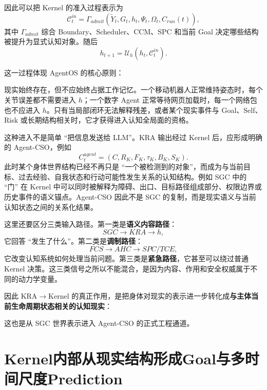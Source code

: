 因此可以把 Kernel 的准入过程表示为
\[
\mathcal C_t^{in}
=
\Gamma_{admit}
\left(
\tilde Y_t,
G_t,
h_t,
\Psi_t,
\Omega_t,
C_{run}(t)
\right),
\]
其中 $\Gamma_{admit}$ 综合 Boundary、Scheduler、CCM、SPC 和当前 Goal 决定哪些结构被提升为显式认知对象。随后
\[
h_{t+1}
=
\mathcal U_h
\left(
h_t,
\mathcal C_t^{in}
\right).
\]

这一过程体现 AgentOS 的核心原则：
\begin{statementbox}
\centering
{}
\end{statementbox}
现实始终存在，但不应始终占据工作记忆。一个移动机器人正常维持姿态时，每个关节误差都不需要进入 $h$；一个数字 Agent 正常等待网页加载时，每一个网络包也不应进入 $h$。只有当局部闭环无法解释残差，或者某个现实事件与 Goal、Self、Risk 或长期结构相关时，它才获得进入认知全局面的资格。

这种进入不是简单 ``把信息发送给 LLM''。KRA 输出经过 Kernel 后，应形成明确的 Agent-CSO，例如
\[
C_t^{agent}
=
\left(
C,
R_K,
F_K,
\tau_K,
B_K,
S_K
\right).
\]
此时某个身体世界结构已经不再只是 ``一个被检测到的对象''，而成为与当前目标、过去经验、自我状态和行动可能性发生关系的认知结构。例如 SGC 中的 ``门'' 在 Kernel 中可以同时被解释为障碍、出口、目标路径组成部分、权限边界或历史事件的语义锚点。Agent-CSO 因此不是 SGC 的复制，而是现实语义与当前认知状态之间的关系化结果。

这里还要区分三类输入路径。第一类是\textbf{语义内容路径}：
\[
SGC
\rightarrow
KRA
\rightarrow
h ,
\]
它回答 ``发生了什么''。第二类是\textbf{调制路径}：
\[
FCS
\rightarrow
AHC
\rightarrow
SPC/TCE ,
\]
它改变认知系统如何处理当前问题。第三类是\textbf{紧急路径}，它甚至可以绕过普通 Kernel 决策。这三类信号之所以不能混合，是因为内容、作用和安全权威属于不同的动力学变量。

因此 KRA$\rightarrow$Kernel 的真正作用，是把身体对现实的表示进一步转化成\textbf{与主体当前生命周期状态相关的认知现实}：
\begin{statementbox}
\centering
{}
\end{statementbox}
这也是从 SGC 世界表示进入 Agent-CSO 的正式工程通道。


\section{Kernel内部从现实结构形成Goal与多时间尺度Prediction}

